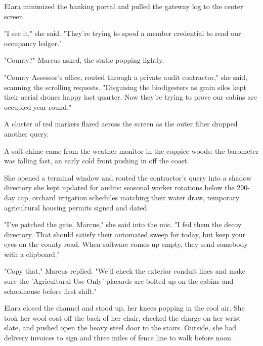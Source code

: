 Elara minimized the banking portal and pulled the gateway log to the center screen.

"I see it," she said. "They’re trying to spoof a member credential to read our occupancy ledger."

"County?" Marcus asked, the static popping lightly. 

"County Assessor's office, routed through a private audit contractor," she said, scanning the scrolling requests. "Disguising the biodigesters as grain silos kept their aerial drones happy last quarter. Now they're trying to prove our cabins are occupied year-round."

A cluster of red markers flared across the screen as the outer filter dropped another query.

A soft chime came from the weather monitor in the coppice woods: the barometer was falling fast, an early cold front pushing in off the coast.

She opened a terminal window and routed the contractor's query into a shadow directory she kept updated for audits: seasonal worker rotations below the 290-day cap, orchard irrigation schedules matching their water draw, temporary agricultural housing permits signed and dated.

"I've patched the gate, Marcus," she said into the mic. "I fed them the decoy directory. That should satisfy their automated sweep for today, but keep your eyes on the county road. When software comes up empty, they send somebody with a clipboard."

"Copy that," Marcus replied. "We'll check the exterior conduit lines and make sure the 'Agricultural Use Only' placards are bolted up on the cabins and schoolhouse before first shift."

Elara closed the channel and stood up, her knees popping in the cool air. She took her wool coat off the back of her chair, checked the charge on her wrist slate, and pushed open the heavy steel door to the stairs. Outside, she had delivery invoices to sign and three miles of fence line to walk before noon.
